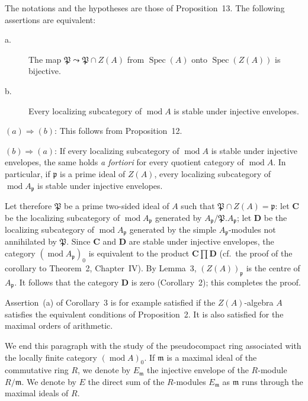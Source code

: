 \begin{corollary}
The notations and the hypotheses are those of Proposition~13. The
following assertions are equivalent:
\begin{description}
\item[\normalfont a.] The map
  $\mathfrak{P}\leadsto\mathfrak{P}\cap Z(A)$ from
  $\operatorname{Spec}(A)$ onto $\operatorname{Spec}(Z(A))$ is
  bijective.
\item[\normalfont b.] Every localizing subcategory of
  $\operatorname{mod}A$ is stable under injective envelopes.
\end{description}
\end{corollary}

$(a)\Rightarrow(b)$: This follows from Proposition~12.

$(b)\Rightarrow(a)$: If every localizing subcategory of
$\operatorname{mod}A$ is stable under injective envelopes, the same
holds \emph{a fortiori} for every quotient category of
$\operatorname{mod}A$. In particular, if $\mathfrak{p}$ is a prime
ideal of $Z(A)$, every localizing subcategory of
$\operatorname{mod}A_{\mathfrak{p}}$ is stable under injective
envelopes.

Let therefore $\mathfrak{P}$ be a prime two-sided ideal of $A$ such
that $\mathfrak{P}\cap Z(A)=\mathfrak{p}$: let $\mathbf{C}$ be the
localizing subcategory of $\operatorname{mod}A_{\mathfrak{p}}$
generated by $A_{\mathfrak{p}}/\mathfrak{P}.A_{\mathfrak{p}}$; let
$\mathbf{D}$ be the localizing subcategory of
$\operatorname{mod}A_{\mathfrak{p}}$ generated by the simple
$A_{\mathfrak{p}}$-modules not annihilated by $\mathfrak{P}$. Since
$\mathbf{C}$ and $\mathbf{D}$ are stable under injective envelopes,
the category $(\operatorname{mod}A_{\mathfrak{p}})_0$ is equivalent to
the product $\mathbf{C}\prod\mathbf{D}$ (cf.~the proof of the corollary
to Theorem~2, Chapter~IV). By Lemma~3, $(Z(A))_{\mathfrak{p}}$ is the
centre of $A_{\mathfrak{p}}$. It follows that the category
$\mathbf{D}$ is zero (Corollary~2); this completes the proof.

Assertion~(a) of Corollary~3 is for example satisfied if the
$Z(A)$-algebra $A$ satisfies the equivalent conditions of
Proposition~2. It is also satisfied for the maximal orders of
arithmetic.

We end this paragraph with the study of the pseudocompact ring
associated with the locally finite category $(\operatorname{mod}A)_0$.
If $\mathfrak{m}$ is a maximal ideal of the commutative ring $R$, we
denote by $E_{\mathfrak{m}}$ the injective envelope of the $R$-module
$R/\mathfrak{m}$. We denote by $E$ the direct sum of the $R$-modules
$E_{\mathfrak{m}}$ as $\mathfrak{m}$ runs through the maximal ideals
of $R$.

